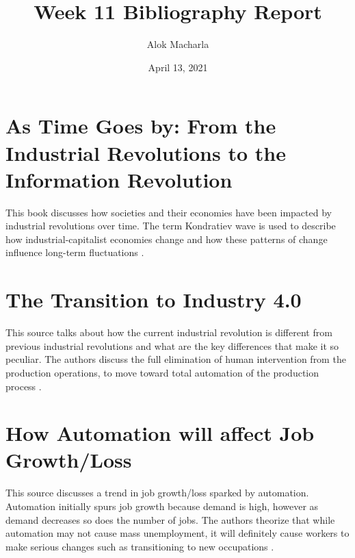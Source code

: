 \documentclass{article}
\title{Week 11 Bibliography Report}
\author{Alok Macharla}
\date{April 13, 2021}
\begin{document}
\maketitle

\section{As Time Goes by: From the Industrial Revolutions to the Information Revolution}
This book discusses how societies and their economies have been impacted by industrial revolutions over time. The term Kondratiev wave is used to describe how industrial-capitalist economies change and how these patterns of change influence long-term fluctuations \cite{freeman2001time}.

\section{The Transition to Industry 4.0}
This source talks about how the current industrial revolution is different from previous industrial revolutions and what are the key differences that make it so peculiar. The authors discuss the full elimination of human intervention from the production operations, to move toward total automation of the production process \cite{Popkova2019}.

\section{How Automation will affect Job Growth/Loss}
This source discusses a trend in job growth/loss sparked by automation. Automation initially spurs job growth because demand is high, however as demand decreases so does the number of jobs. The authors theorize that while automation may not cause mass unemployment, it will definitely cause workers to make serious changes such as transitioning to new occupations \cite{14450544920191001}.




\end{document}
